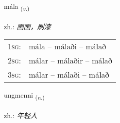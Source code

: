 \documentclass[frontgrid, backgrid]{flacards}\usepackage[]{graphicx}\usepackage[]{xcolor}
\begin{document}
\renewcommand{\flhead}{\vskip5pt \fboxsep=0pt {\small\bfseries\footnotesize Sagnorð | 动词}}
\renewcommand{\fcfoot}{\vskip5pt \fboxsep=0pt \hspace{2pt}{\small\bfseries\footnotesize 3K}}

\renewcommand{\blhead}{\vskip5pt {\small\bfseries\footnotesize Sagnorð | 动词 }}
\renewcommand{\bcfoot}{\vskip5pt \hspace{2pt}{\small\bfseries\footnotesize 3K}}


{mála \small{\textsubscript{(\textit{v.})}} \\[1ex] %
\textphonetic{[mauːla]} \\
zh.: \emph{画画，刷漆} \\  [2ex]
\renewcommand*{\arraystretch}{0.8}
\begin{tabular}{p{1cm}l}
\textsc{1sg}: & mála -- málaði -- málað \\ 
\textsc{2sg}: & málar -- málaðir -- málað \\ 
\textsc{3sg}: & málar -- málaði -- málað \\ 
\end{tabular}
}

\renewcommand{\flhead}{\vskip5pt \fboxsep=0pt {\small\bfseries\footnotesize Nafnorð | 名词}}
\renewcommand{\fcfoot}{\vskip5pt \fboxsep=0pt \hspace{2pt}{\small\bfseries\footnotesize 3K}}

\renewcommand{\blhead}{\vskip5pt {\small\bfseries\footnotesize Nafnorð | 名词 }}
\renewcommand{\bcfoot}{\vskip5pt \hspace{2pt}{\small\bfseries\footnotesize 3K}}


{ungmenni \small{\textsubscript{(\textit{n.})}} \\[1ex] %
\textphonetic{[uŋkmɛnɪ]} \\
zh.: \emph{年轻人} \\  [2ex]
\renewcommand*{\arraystretch}{0.8}
}
\end{document}
